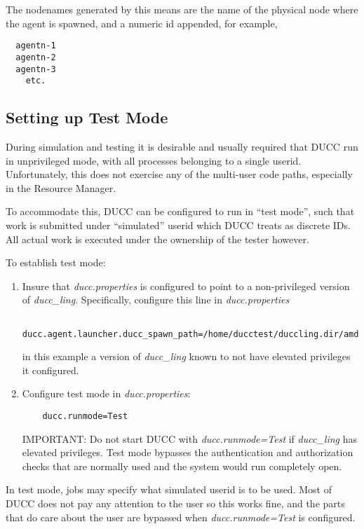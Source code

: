       The nodenames generated by this means are the name of the physical node where
      the agent is spawned, and a numeric id appended, for example,
\begin{verbatim}
  agentn-1
  agentn-2
  agentn-3
    etc.
\end{verbatim}

      \subsection{Setting up Test Mode}

      During simulation and testing it is desirable and usually required that DUCC run
      in unprivileged mode, with all processes belonging to a single userid.  Unfortunately,
      this does not exercise any of the multi-user code paths, especially in the Resource
      Manager.

      To accommodate this, DUCC can be configured to run in ``test mode'', such that work
      is submitted under ``simulated'' userid which DUCC treats as discrete IDs.  All actual
      work is executed under the ownership of the tester however.

      To establish test mode:
      \begin{enumerate}
          \item Insure that {\em ducc.properties} is configured to point to a non-privileged
            version of {\em ducc\_ling}.  Specifically, configure this line in {\em ducc.properties}
\begin{verbatim}
    ducc.agent.launcher.ducc_spawn_path=/home/ducctest/duccling.dir/amd64/ducc_ling
\end{verbatim}
            in this example a version of {\em ducc\_ling} known to not have elevated privileges
            it configured.
          \item Configure test mode in {\em ducc.properties}:
\begin{verbatim}
    ducc.runmode=Test
\end{verbatim}
            IMPORTANT: Do not start DUCC with {\em ducc.runmode=Test} if {\em ducc\_ling} has
            elevated privileges.  Test mode bypasses the authentication and authorization checks
            that are normally used and the system would run completely open.
      \end{enumerate}

      In test mode, jobs may specify what simulated userid is to be used.  Most of DUCC does not
      pay any attention to the user so this works fine, and the parts that do care about the
      user are bypassed when {\em ducc.runmode=Test} is configured.

